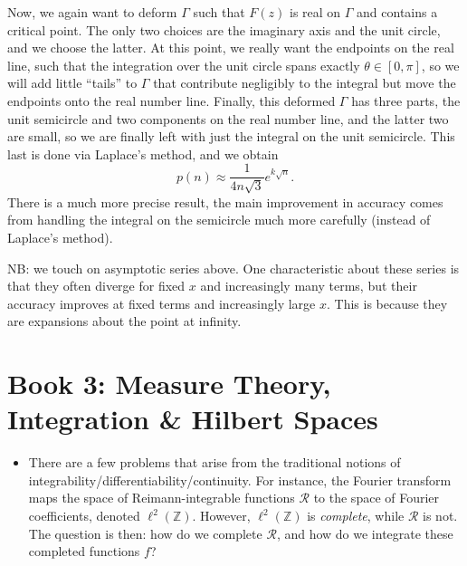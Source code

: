 \documentclass[11pt,
        usenames, %
        dvipsnames %
    ]{report}
\begin{document}
\begin{itemize}
        Now, we again want to deform $\Gamma$ such that $F(z)$ is real on
        $\Gamma$ and contains a critical point. The only two choices are the
        imaginary axis and the unit circle, and we choose the latter. At this
        point, we really want the endpoints on the real line, such that the
        integration over the unit circle spans exactly $\theta \in [0, \pi]$, so
        we will add little ``tails'' to $\Gamma$ that contribute negligibly to
        the integral but move the endpoints onto the real number line. Finally,
        this deformed $\Gamma$ has three parts, the unit semicircle and two
        components on the real number line, and the latter two are small, so we
        are finally left with just the integral on the unit semicircle. This
        last is done via Laplace's method, and we obtain
        \begin{equation}
            p(n) \approx \frac{1}{4n\sqrt{3}}e^{k\sqrt{n}}.
        \end{equation}
        There is a much more precise result, the main improvement in accuracy
        comes from handling the integral on the semicircle much more carefully
        (instead of Laplace's method).
\end{itemize}

NB\@: we touch on asymptotic series above. One characteristic about these series
is that they often diverge for fixed $x$ and increasingly many terms, but their
accuracy improves at fixed terms and increasingly large $x$. This is because
they are expansions about the point at infinity.

\section{Book 3: Measure Theory, Integration \& Hilbert Spaces}

\begin{itemize}
    \item There are a few problems that arise from the traditional notions of
        integrability/differentiability/continuity. For instance, the Fourier
        transform maps the space of Reimann-integrable functions $\mathcal{R}$ to
        the space of Fourier coefficients, denoted $\ell^2(\mathbb{Z})$.
        However, $\ell^2(\mathbb{Z})$ is \emph{complete}, while $\mathcal{R}$ is
        not. The question is then: how do we complete $\mathcal{R}$, and how do
        we integrate these completed functions $f$?
\end{itemize}
\end{document}
